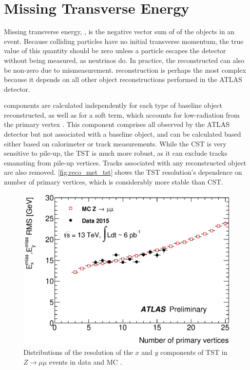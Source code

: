 \section{Missing Transverse Energy}
\label{sec:reco_met}

Missing transverse energy, \met, is the negative vector sum of \pt of the objects in an event. Because colliding particles have no initial transverse momentum, the true value of this quantity should be zero unless a particle escapes the detector without being measured, as neutrinos do. In practice, the reconstructed \met can also be non-zero due to mismeasurement. \met reconstruction is perhaps the most complex because it depends on all other object reconstructions performed in the ATLAS detector. 

\met components are calculated independently for each type of baseline object reconstructed, as well as for a soft term, which accounts for low-\pt radiation from the primary vertex \cite{ATL-PHYS-PUB-2015-023}. This component comprises all \pt observed by the ATLAS detector but not associated with a baseline object, and can be calculated based either based on calorimeter or track measurements. While the \ac{CST} is very sensitive to pile-up, the \ac{TST} is much more robust, as it can exclude tracks emanating from pile-up vertices. Tracks associated with any reconstructed object are also removed. \autoref{fig:reco_met_tst} shows the \ac{TST} resolution's dependence on number of primary vertices, which is considerably more stable than \ac{CST}.

\begin{centering}
\begin{figure}[!hbt]
\myfloatalign
\includegraphics[width=.9\linewidth]{figures/reco/met_fig_04b.eps}
\caption{ Distributions of the resolution of the $x$ and $y$ components of \ac{TST} \met in $Z\rightarrow\mu\mu$ events in data and \ac{MC} \cite{ATL-PHYS-PUB-2015-027}. }
\label{fig:reco_met_tst}
\end{figure}
\end{centering}

